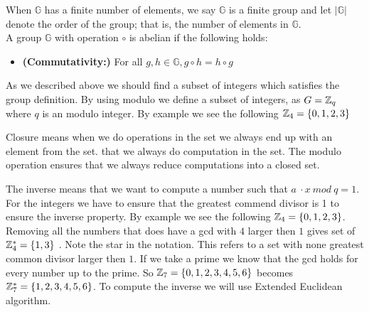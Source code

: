 \begin{defi}
\begin{itemize}
\end{itemize}
When \begin{math}\mathbb{G}\end{math} has a finite number of elements, we say \begin{math}\mathbb{G}\end{math} is a finite group and let
\begin{math}| \mathbb{G}|\end{math} denote the order of the group; that is, the number of elements in \begin{math}\mathbb{G}\end{math}. \\
A group \begin{math}\mathbb{G}\end{math} with operation \begin{math}\circ\end{math} is abelian if the following holds:
\begin{itemize}
\item \textnormal{\textbf{(Commutativity:)}} For all \begin{math}g, h \in \mathbb{G}, g \circ h = h \circ g \end{math}
\end{itemize}
\end{defi}

\noindent
As we described above we should find a subset of integers which satisfies the group definition. By using modulo we define a subset of integers, as $G= \mathbb{Z}_q $ where $q$ is an modulo integer. By example we see the following \begin{math} \mathbb{Z}_4 = \{0,1,2,3\}\end{math}   


 Closure means when we do operations in the set we always end up with an element from the set. that we always do computation in the set. The modulo operation ensures that we always reduce computations into a closed set.


 The inverse means that we want to compute a number such that \begin{math}a\ \cdot x \ mod \ q = 1 \end{math}.  For the integers we have to ensure that the greatest commend divisor is 1 to ensure the inverse property. By example we see the following \begin{math} \mathbb{Z}_4 = \{0,1,2,3\}\end{math}. Removing all the numbers that does have a gcd with $4$ larger then $1$ gives set of $\mathbb{Z}_4^* = \{1,3\}$ . Note the star in the notation. This refers to a set with none greatest common divisor larger then $1$. If we take a prime we know that the gcd holds for every number up to the prime. So  \begin{math} \mathbb{Z}_7 = \{0,1,2,3,4,5,6\}\end{math} becomes \begin{math} \mathbb{Z}_7^* = \{1,2,3,4,5,6\}\end{math}. To compute the inverse we will use Extended Euclidean algorithm.


